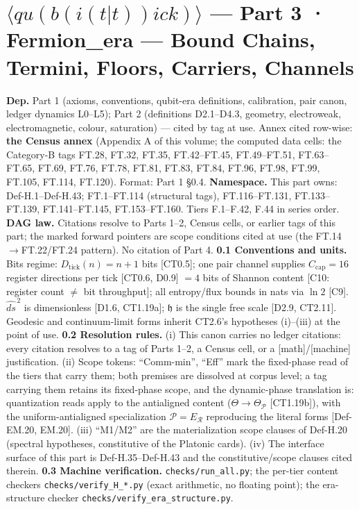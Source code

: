 \chapter{\texorpdfstring{$\langle qu(b(i(t|t))ick)\rangle$ — \textbf{Part 3 · Fermion\_era} — Bound Chains, Termini, Floors, Carriers, Channels}{Qubitick - **Part 3 - Fermion _era** - Bound Chains, Termini, Floors, Carriers, Channels}}

\textbf{Dep.} Part 1 (axioms, conventions, qubit-era definitions, calibration, pair canon, ledger dynamics L0–L5); Part 2 (definitions D2.1–D4.3, geometry, electroweak, electromagnetic, colour, saturation) — cited by tag at use. Annex cited row-wise: \textbf{the Census annex} (Appendix A of this volume; the computed data cells: the Category-B tags FT.28, FT.32, FT.35, FT.42–FT.45, FT.49–FT.51, FT.63–FT.65, FT.69, FT.76, FT.78, FT.81, FT.83, FT.84, FT.96, FT.98, FT.99, FT.105, FT.114, FT.120). Format: Part 1 §0.4. \textbf{Namespace.} This part owns: Def-H.1–Def-H.43; FT.1–FT.114 (structural tags), FT.116–FT.131, FT.133–FT.139, FT.141–FT.145, FT.153–FT.160. Tiers F.1–F.42, F.44 in series order. \textbf{DAG law.} Citations resolve to Parts 1–2, Census cells, or earlier tags of this part; the marked forward pointers are scope conditions cited at use (the FT.14$\to$FT.22/FT.24 pattern). No citation of Part 4. \textbf{0.1 Conventions and units.} Bits regime: $D_{\mathrm{tick}}(n)=n{+}1$ bits [CT0.5]; one pair channel supplies $C_{\mathrm{cap}}=16$ register directions per tick [CT0.6, D0.9] $=4$ bits of Shannon content [C10: register count $\ne$ bit throughput]; all entropy/flux bounds in nats via $\ln2$ [C9]. $\widehat{ds}^{\,2}$ is dimensionless [D1.6, CT1.19a]; $\mathfrak h$ is the single free scale [D2.9, CT2.11]. Geodesic and continuum-limit forms inherit CT2.6's hypotheses (i)–(iii) at the point of use. \textbf{0.2 Resolution rules.} (i) This canon carries no ledger citations: every citation resolves to a tag of Parts 1–2, a Census cell, or a [math]/[machine] justification. (ii) Scope tokens: “Comm-min”, “Eff” mark the fixed-phase read of the tiers that carry them; both premises are dissolved at corpus level; a tag carrying them retains its fixed-phase scope, and the dynamic-phase translation is: quantization reads apply to the antialigned content ($\Theta\to\Theta_{\mathcal P}$ [CT1.19b]), with the uniform-antialigned specialization $\mathcal P=E_{\mathcal R}$ reproducing the literal forms [Def-EM.20, EM.20]. (iii) “M1/M2” are the materialization scope clauses of Def-H.20 (spectral hypotheses, constitutive of the Platonic cards). (iv) The interface surface of this part is Def-H.35–Def-H.43 and the constitutive/scope clauses cited therein. \textbf{0.3 Machine verification.} \texttt{checks/\allowbreak{}run\_\allowbreak{}all.py}; the per-tier content checkers \texttt{checks/\allowbreak{}verify\_\allowbreak{}H\_\allowbreak{}*.py} (exact arithmetic, no floating point); the era-structure checker \texttt{checks/\allowbreak{}verify\_\allowbreak{}era\_\allowbreak{}structure.py}.

